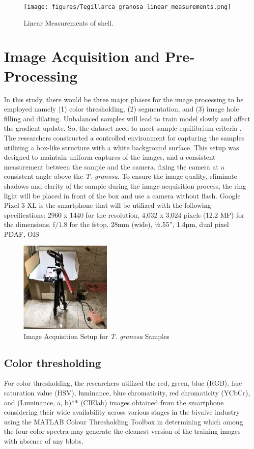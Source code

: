 \begin{figure}[!htbp]
	\centering
	\texttt{[image: figures/Tegillarca\_granosa\_linear\_measurements.png]}
	\caption{Linear Measurements of  \Tegillarcagranosa shell.}
\end{figure}

\section{Image Acquisition and Pre-Processing}
\label{sec:imageprocess}
In this study, there would be three major phases for the image processing to be employed namely (1) color thresholding, (2) segmentation, and (3) image hole filling and dilating. Unbalanced samples will lead to train model slowly and affect the gradient update. So, the dataset need to meet sample equilibrium criteria \cite{cui2020}. The researchers constructed a controlled environment for capturing the samples utilizing a box-like structure with a white background surface. This setup was designed to maintain uniform captures of the images, and a consistent measurement between the sample and the camera, fixing the camera at a consistent angle above the \textit{T. granosa}. To ensure the image quality, eliminate shadows and clarity of the sample during the image acquisition process, the ring light will be placed in front of the box and use a camera without flash. Google Pixel 3 XL is the smartphone that will be utilized with the following specifications: 2960 x 1440 for the resolution, 4,032 x 3,024 pixels (12.2 MP) for the dimensions, f/1.8 for the fstop, 28mm (wide), ½.55”, 1.4µm, dual pixel PDAF, OIS \cite{concepcion2023}

\begin{figure}[!htbp]
	\centering
	\includegraphics[width=0.4\textwidth]{figures/setup.jpg}
	\caption{Image Acquisition Setup for \textit{T. granosa} Samples}
\end{figure}

\newpage
\subsection{Color thresholding}
For color thresholding, the researchers utilized the red, green, blue (RGB), hue saturation value (HSV), luminance, blue chromaticity, red chromaticity (YCbCr), and (Luminance, a, b)** (CIElab) images obtained from the smartphone considering their wide availability across various stages in the bivalve industry using the MATLAB Colour Thresholding Toolbox in determining which among the four-color spectra may generate the cleanest version of the training images with absence of any blobs. 


